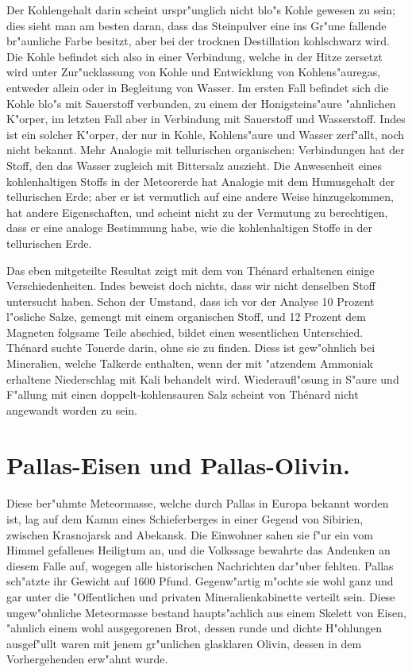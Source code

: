 \documentclass[a4paper, 11pt, oneside]{article}
\begin{document}
Der Kohlengehalt darin scheint urspr"unglich nicht blo"s Kohle gewesen zu sein; dies sieht man am besten daran, dass das Steinpulver eine ins Gr"une fallende br"aunliche Farbe besitzt, aber bei der trocknen Destillation kohlschwarz wird. Die Kohle befindet sich also in einer Verbindung, welche in der Hitze zersetzt wird unter Zur"ucklassung von Kohle und Entwicklung von Kohlens"auregas, entweder allein oder in Begleitung von Wasser. Im ersten Fall befindet sich die Kohle blo"s mit Sauerstoff verbunden, zu einem der Honigsteins"aure "ahnlichen K"orper, im letzten Fall aber in Verbindung mit Sauerstoff und Wasserstoff. Indes ist ein solcher K"orper, der nur in Kohle, Kohlens"aure und Wasser zerf"allt, noch nicht bekannt. Mehr Analogie mit tellurischen organischen: Verbindungen hat der Stoff, den das Wasser zugleich mit Bittersalz auszieht. Die Anwesenheit eines kohlenhaltigen Stoffs in der Meteorerde hat Analogie mit dem Humusgehalt der tellurischen Erde; aber er ist vermutlich auf eine andere Weise hinzugekommen, hat andere Eigenschaften, und scheint nicht zu der Vermutung zu berechtigen, dass er eine analoge Bestimmung habe, wie die kohlenhaltigen Stoffe in der tellurischen Erde.

Das eben mitgeteilte Resultat zeigt mit dem von Thénard erhaltenen einige Verschiedenheiten. Indes beweist doch nichts, dass wir nicht denselben Stoff untersucht haben. Schon der Umstand, dass ich vor der Analyse 10 Prozent l"osliche Salze, gemengt mit einem organischen Stoff, und 12 Prozent dem Magneten folgsame Teile abschied, bildet einen wesentlichen Unterschied. Thénard suchte Tonerde darin, ohne sie zu finden. Diess ist gew"ohnlich bei Mineralien, welche Talkerde enthalten, wenn der mit "atzendem Ammoniak erhaltene Niederschlag mit Kali behandelt wird. Wiederaufl"osung in S"aure und F"allung mit einen doppelt-kohlensauren Salz scheint von Thénard nicht angewandt worden zu sein.

\section{Pallas-Eisen und Pallas-Olivin.}
\paragraph{}
Diese ber"uhmte Meteormasse, welche durch Pallas in Europa bekannt worden ist, lag auf dem Kamm eines Schieferberges in einer Gegend von Sibirien, zwischen Krasnojarsk and Abekansk. Die Einwohner sahen sie f"ur ein vom Himmel gefallenes Heiligtum an, und die Volkssage bewahrte das Andenken an diesem Falle auf, wogegen alle historischen Nachrichten dar"uber fehlten. Pallas sch"atzte ihr Gewicht auf 1600 Pfund. Gegenw"artig m"ochte sie wohl ganz und gar unter die "Offentlichen und privaten Mineralienkabinette verteilt sein. Diese ungew"ohnliche Meteormasse bestand haupts"achlich aus einem Skelett von Eisen, "ahnlich einem wohl ausgegorenen Brot, dessen runde und dichte H"ohlungen ausgef"ullt waren mit jenem gr"unlichen glasklaren Olivin, dessen in dem Vorhergehenden erw"ahnt wurde.
\end{document}
